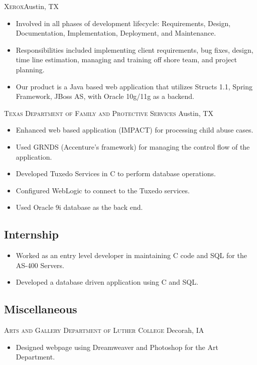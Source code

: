 \documentclass[11pt,letterpaper,sans]{moderncv}
\begin{document}
     {\textsc{Xerox}}{Austin, TX}{}
     {\begin{itemize}
         \item Involved in all phases of development lifecycle: 
               Requirements, Design, Documentation, Implementation, 
               Deployment, and Maintenance.
         \item Responsibilities included implementing client requirements, bug
               fixes, design, time line estimation, managing and training off
               shore team, and project planning.
         \item Our product is a Java based web application that utilizes 
               Structs 1.1, Spring Framework, JBoss AS, with Oracle 10g/11g 
               as a backend.
     \end{itemize}}
     
     {\textsc{Texas Department of Family and Protective Services}}
             {Austin, TX}{}
     {\begin{itemize}
         \item Enhanced web based application (IMPACT) for processing child 
               abuse cases.
         \item Used GRNDS (Accenture's framework) for managing the control flow 
               of the application.
         \item Developed Tuxedo Services in C to perform database operations.
         \item Configured WebLogic to connect to the Tuxedo services.
         \item Used Oracle 9i database as the back end.
     \end{itemize}}

  \subsection{Internship}
     {\begin{itemize}
         \item Worked as an entry level developer in maintaining C code and 
               SQL for the AS-400 Servers.
         \item Developed a database driven application using C and SQL.
     \end{itemize}}
  
  \subsection{Miscellaneous}
     {\textsc{Arts and Gallery Department of Luther College}}
     {Decorah, IA}{}
     {\begin{itemize}
         \item Designed webpage using Dreamweaver and Photoshop for the 
               Art Department.
     \end{itemize}}
\end{document}
